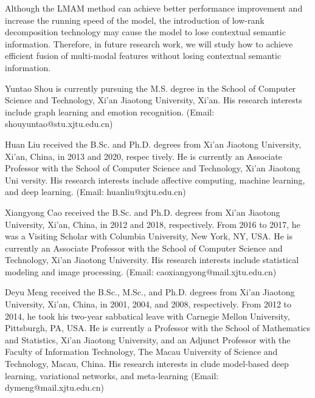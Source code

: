 {{{Although the LMAM method can achieve better performance improvement and increase the running speed of the model, the introduction of low-rank decomposition technology may cause the model to lose contextual semantic information. Therefore, in future research work, we will study how to achieve efficient fusion of multi-modal features without losing contextual semantic information.}

\begin{IEEEbiography}{Yuntao Shou} is currently pursuing the M.S. degree in the School of Computer Science and Technology, Xi'an Jiaotong University, Xi'an. His research interests include graph learning and emotion recognition. (Email: shouyuntao@stu.xjtu.edu.cn)
\end{IEEEbiography}

\begin{IEEEbiography}{Huan Liu}  received the B.Sc. and Ph.D. degrees from Xi’an
	Jiaotong University, Xi’an, China, in 2013 and 2020, respec
	tively. He is currently an Associate Professor with the School
	of Computer Science and Technology, Xi’an Jiaotong Uni
	versity. His research interests include affective computing,
	machine learning, and deep learning. (Email: huanliu@xjtu.edu.cn)
\end{IEEEbiography}

\begin{IEEEbiography}{Xiangyong Cao}  received the B.Sc. and Ph.D. degrees from
	Xi’an Jiaotong University, Xi’an, China, in 2012 and 2018,
	respectively. From 2016 to 2017, he was a Visiting Scholar
	with Columbia University, New York, NY, USA. He is currently an Associate Professor with the School of Computer
	Science and Technology, Xi’an Jiaotong University. His
	research interests include statistical modeling and image
	processing. (Email: caoxiangyong@mail.xjtu.edu.cn)
\end{IEEEbiography}

\begin{IEEEbiography}{Deyu Meng} received the B.Sc., M.Sc., and Ph.D. degrees
	from Xi’an Jiaotong University, Xi’an, China, in 2001, 2004,
	and 2008, respectively. From 2012 to 2014, he took his
	two-year sabbatical leave with Carnegie Mellon University,
	Pittsburgh, PA, USA. He is currently a Professor with
	the School of Mathematics and Statistics, Xi’an Jiaotong
	University, and an Adjunct Professor with the Faculty of
	Information Technology, The Macau University of Science
	and Technology, Macau, China. His research interests in
	clude model-based deep learning, variational networks, and
	meta-learning (Email: dymeng@mail.xjtu.edu.cn)
\end{IEEEbiography}

}}
